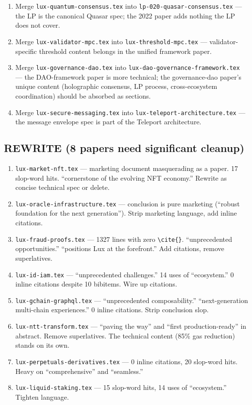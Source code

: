 \documentclass[11pt,a4paper]{article}
\begin{document}
\begin{enumerate}
\item Merge \texttt{lux-quantum-consensus.tex} into \texttt{lp-020-quasar-consensus.tex} --- the LP is the canonical Quasar spec; the 2022 paper adds nothing the LP does not cover.
\item Merge \texttt{lux-validator-mpc.tex} into \texttt{lux-threshold-mpc.tex} --- validator-specific threshold content belongs in the unified framework paper.
\item Merge \texttt{lux-governance-dao.tex} into \texttt{lux-dao-governance-framework.tex} --- the DAO-framework paper is more technical; the governance-dao paper's unique content (holographic consensus, LP process, cross-ecosystem coordination) should be absorbed as sections.
\item Merge \texttt{lux-secure-messaging.tex} into \texttt{lux-teleport-architecture.tex} --- the message envelope spec is part of the Teleport architecture.
\end{enumerate}

\subsection{REWRITE (8 papers need significant cleanup)}

\begin{enumerate}
\item \texttt{lux-market-nft.tex} --- marketing document masquerading as a paper. 17 slop-word hits. ``cornerstone of the evolving NFT economy.'' Rewrite as concise technical spec or delete.
\item \texttt{lux-oracle-infrastructure.tex} --- conclusion is pure marketing (``robust foundation for the next generation''). Strip marketing language, add inline citations.
\item \texttt{lux-fraud-proofs.tex} --- 1327 lines with zero \texttt{\textbackslash cite\{\}}. ``unprecedented opportunities.'' ``positions Lux at the forefront.'' Add citations, remove superlatives.
\item \texttt{lux-id-iam.tex} --- ``unprecedented challenges.'' 14 uses of ``ecosystem.'' 0 inline citations despite 10 bibitems. Wire up citations.
\item \texttt{lux-gchain-graphql.tex} --- ``unprecedented composability.'' ``next-generation multi-chain experiences.'' 0 inline citations. Strip conclusion slop.
\item \texttt{lux-ntt-transform.tex} --- ``paving the way'' and ``first production-ready'' in abstract. Remove superlatives. The technical content (85\% gas reduction) stands on its own.
\item \texttt{lux-perpetuals-derivatives.tex} --- 0 inline citations, 20 slop-word hits. Heavy on ``comprehensive'' and ``seamless.''
\item \texttt{lux-liquid-staking.tex} --- 15 slop-word hits, 14 uses of ``ecosystem.'' Tighten language.
\end{enumerate}
\end{document}
